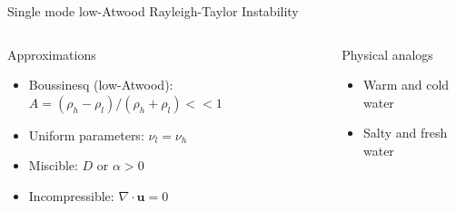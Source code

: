\documentclass[12pt]{beamer}
\begin{document}
\begin{frame}{Single mode low-Atwood Rayleigh-Taylor Instability}
\begin{columns}[c]

\begin{block}{Approximations}
\begin{itemize}
	\item Boussinesq (low-Atwood): $A =(\rho_h-\rho_l) / (\rho_h+\rho_l) << 1$
  \item Uniform parameters: $\nu_l = \nu_h$
  \item Miscible: $D$ or $\alpha > 0$
  \item Incompressible: $\nabla \cdot \mathbf{u} = 0$
\end{itemize}
\end{block}

\begin{exampleblock}{Physical analogs}
\begin{itemize}
  \item Warm and cold water
  \item Salty and fresh water
\end{itemize}
\end{exampleblock}

\resizebox{!}{0.9\textheight}{}
\end{columns}
\end{frame}
\end{document}
